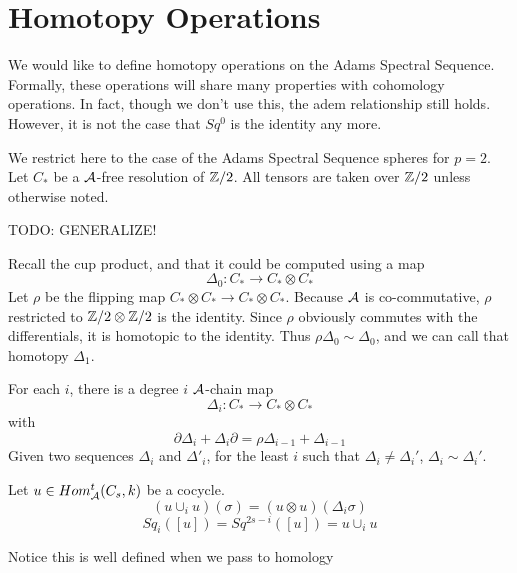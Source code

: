 

\section{Homotopy Operations}

We would like to define homotopy operations on the Adams Spectral Sequence.
Formally, these operations will share many properties with cohomology operations.  
In fact, though we don't use this, the adem relationship still holds.  
However, it is not the case that $Sq^0$ is the identity any more.  

We restrict here to the case of the Adams Spectral Sequence spheres for $p=2$.
Let $C_*$ be a $\mathcal{A}$-free resolution of $\mathbb{Z}/2$.  
All tensors are taken over $\mathbb{Z}/2$ unless otherwise noted.  


TODO: GENERALIZE!

Recall the cup product, and that it could be computed using a map 
\[\Delta_0:C_*\to C_*\otimes C_*\]
Let $\rho$ be the flipping map $C_*\otimes C_*\to C_*\otimes C_*$.  
Because $\mathcal{A}$ is co-commutative, $\rho$ restricted to $\mathbb{Z}/2\otimes \mathbb{Z}/2$ is the identity.
Since $\rho$ obviously commutes with the differentials, it is homotopic to the identity.
Thus $\rho\Delta_0\sim\Delta_0$, and we can call that homotopy $\Delta_1$.  

\begin{Lemma}
  For each $i$, there is a degree $i$ $\mathcal{A}$-chain map
  \[\Delta_i:C_*\to C_*\otimes C_*\]
  with
  \[\partial\Delta_i+\Delta_i\partial=\rho\Delta_{i-1}+\Delta_{i-1}\]
  Given two sequences $\Delta_i$ and $\Delta'_i$, for the least $i$ such that $\Delta_i\ne \Delta_i'$, $\Delta_i\sim\Delta_i'$.  
\end{Lemma}

\begin{mydef}
  Let $u\in Hom_{\mathcal{A}}^t(C_s,k)$ be a cocycle.  
  \[(u\cup_i u)(\sigma)=(u\otimes u)(\Delta_i\sigma)\]
  \[Sq_i([u])=Sq^{2s-i}([u])=u\cup_i u\]
\end{mydef}
Notice this is well defined when we pass to homology


